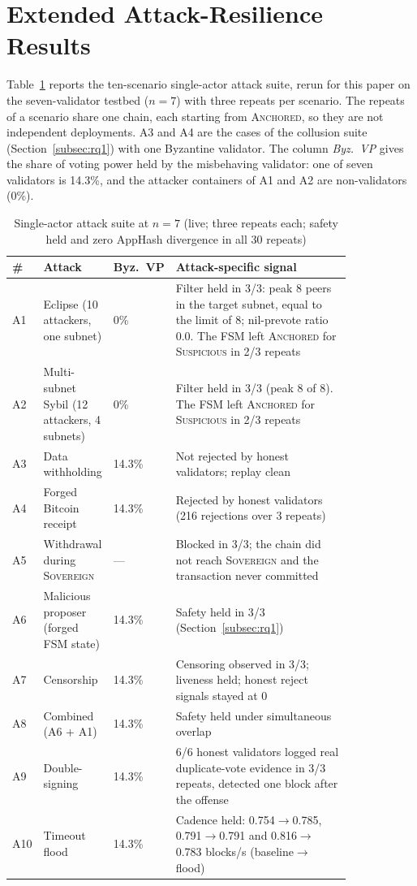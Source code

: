 \section{Extended Attack-Resilience Results}
\label{app:attacks}

Table~\ref{tab:attack-full} reports the ten-scenario single-actor attack
suite, rerun for this paper on the seven-validator testbed ($n{=}7$) with
three repeats per scenario. The repeats of a scenario share one chain, each starting
from \textsc{Anchored}, so they are not independent deployments. A3 and A4 are
the cases of the collusion suite (Section~\ref{subsec:rq1}) with one Byzantine
validator. The column \emph{Byz.\ VP} gives the share of voting power held by
the misbehaving validator: one of seven validators is 14.3\%, and the attacker
containers of A1 and A2 are non-validators (0\%).

\begin{table}[h]
\caption{Single-actor attack suite at $n{=}7$ (live; three repeats each; safety
held and zero AppHash divergence in all 30 repeats)}
\label{tab:attack-full}
\centering
\footnotesize
\begin{tabular}{@{}p{0.04\linewidth}p{0.17\linewidth}p{0.07\linewidth}p{0.55\linewidth}@{}}
\toprule
\textbf{\#} & \textbf{Attack} & \textbf{Byz.\ VP} & \textbf{Attack-specific signal} \\
\midrule
A1 & Eclipse (10 attackers, one subnet) & 0\% & Filter held in 3/3: peak 8 peers in the target subnet, equal to the limit of 8; nil-prevote ratio 0.0. The FSM left \textsc{Anchored} for \textsc{Suspicious} in 2/3 repeats \\
A2 & Multi-subnet Sybil (12 attackers, 4 subnets) & 0\% & Filter held in 3/3 (peak 8 of 8). The FSM left \textsc{Anchored} for \textsc{Suspicious} in 2/3 repeats \\
A3 & Data withholding & 14.3\% & Not rejected by honest validators; replay clean \\
A4 & Forged Bitcoin receipt & 14.3\% & Rejected by honest validators (216 rejections over 3 repeats) \\
A5 & Withdrawal during \textsc{Sovereign} & --- & Blocked in 3/3; the chain did not reach \textsc{Sovereign} and the transaction never committed \\
A6 & Malicious proposer (forged FSM state) & 14.3\% & Safety held in 3/3 (Section~\ref{subsec:rq1}) \\
A7 & Censorship & 14.3\% & Censoring observed in 3/3; liveness held; honest reject signals stayed at 0 \\
A8 & Combined (A6 + A1) & 14.3\% & Safety held under simultaneous overlap \\
A9 & Double-signing & 14.3\% & 6/6 honest validators logged real duplicate-vote evidence in 3/3 repeats, detected one block after the offense \\
A10 & Timeout flood & 14.3\% & Cadence held: 0.754$\to$0.785, 0.791$\to$0.791 and 0.816$\to$0.783 blocks/s (baseline$\to$flood) \\
\bottomrule
\end{tabular}
\end{table}

